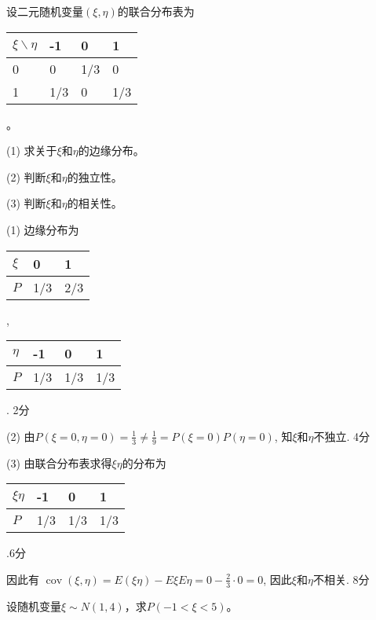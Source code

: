 \documentclass{USTBExam}
\newcommand{\cov}{\operatorname{cov}}
\begin{document}


\begin{problem}
设二元随机变量$(\xi, \eta)$的联合分布表为
\begin{tabular}{|l|l|l|l|}
  \hline
  $\xi \backslash \eta$ & -1 & 0 & 1\\
  \hline
  0 & 0 & 1/3 & 0\\
  \hline
  1 & 1/3 & 0 & 1/3\\
  \hline
\end{tabular}。\par
(1) 求关于$\xi$和$\eta$的边缘分布。\par
(2) 判断$\xi$和$\eta$的独立性。\par
(3) 判断$\xi$和$\eta$的相关性。
\end{problem}

\bigskip

\begin{solution}
(1) 边缘分布为 \begin{tabular}{|l|l|l|}
  \hline
  $\xi$ & 0 & 1\\
  \hline
  $P$ & 1/3 & 2/3\\
  \hline
\end{tabular}, \ \begin{tabular}{|l|l|l|l|}
  \hline
  $\eta$ & -1 & 0 & 1\\
  \hline
  $P$ & 1/3 & 1/3 & 1/3\\
  \hline
\end{tabular}. \dotfill 2分 \par
(2) 由$P(\xi = 0, \eta = 0) = \frac{1}{3} \neq \frac{1}{9} = P(\xi = 0) P(\eta = 0)$,
知$\xi$和$\eta$不独立. \dotfill 4分 \par
(3) 由联合分布表求得$\xi \eta$的分布为 \begin{tabular}{|l|l|l|l|}
  \hline
  $\xi \eta$ & -1 & 0 & 1\\
  \hline
  $P$ & 1/3 & 1/3 & 1/3\\
  \hline
\end{tabular}.\dotfill 6分\par
因此有 $\cov(\xi, \eta) = E(\xi\eta) - E\xi E\eta = 0 -\frac{2}{3} \cdot 0 = 0$,
因此$\xi$和$\eta$不相关. \dotfill 8分
\end{solution}


\begin{problem}
设随机变量$\xi \sim N (1, 4)$，求$P (- 1 < \xi < 5)$。
\end{problem}
\end{document}
